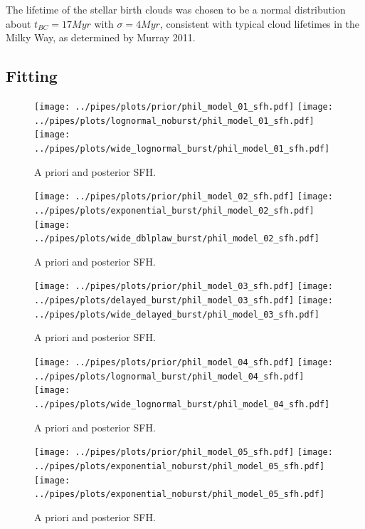 \documentclass[a4paper,11pt]{article}
\begin{document}
The lifetime of the stellar birth clouds was chosen to be a normal distribution about ${t_{BC}=17Myr}$ with ${\sigma=4Myr}$, consistent with typical cloud lifetimes in the Milky Way, as determined by Murray 2011\cite{Murray_2011}.


\subsection{Fitting}\label{sec:fitting}

\begin{figure}[h!]
\centering
  \texttt{[image: ../pipes/plots/prior/phil\_model\_01\_sfh.pdf]}
  \texttt{[image: ../pipes/plots/lognormal\_noburst/phil\_model\_01\_sfh.pdf]}
  \texttt{[image: ../pipes/plots/wide\_lognormal\_burst/phil\_model\_01\_sfh.pdf]}
  \caption{A priori and posterior SFH.}
  \label{}
\end{figure}

\newpage
\begin{figure}[h!]
  \centering
  \texttt{[image: ../pipes/plots/prior/phil\_model\_02\_sfh.pdf]}
  \texttt{[image: ../pipes/plots/exponential\_burst/phil\_model\_02\_sfh.pdf]}
  \texttt{[image: ../pipes/plots/wide\_dblplaw\_burst/phil\_model\_02\_sfh.pdf]}
  \caption{A priori and posterior SFH.}
  \label{}
\end{figure}

\newpage
\begin{figure}[h!]
  \centering
  \texttt{[image: ../pipes/plots/prior/phil\_model\_03\_sfh.pdf]}
  \texttt{[image: ../pipes/plots/delayed\_burst/phil\_model\_03\_sfh.pdf]}
  \texttt{[image: ../pipes/plots/wide\_delayed\_burst/phil\_model\_03\_sfh.pdf]}
  \caption{A priori and posterior SFH.}
  \label{}
\end{figure}

\newpage
\begin{figure}[h!]
  \centering
  \texttt{[image: ../pipes/plots/prior/phil\_model\_04\_sfh.pdf]}
  \texttt{[image: ../pipes/plots/lognormal\_burst/phil\_model\_04\_sfh.pdf]}
  \texttt{[image: ../pipes/plots/wide\_lognormal\_burst/phil\_model\_04\_sfh.pdf]}
  \caption{A priori and posterior SFH.}
  \label{}
\end{figure}

\newpage
\begin{figure}[h!]
  \centering
  \texttt{[image: ../pipes/plots/prior/phil\_model\_05\_sfh.pdf]}
  \texttt{[image: ../pipes/plots/exponential\_noburst/phil\_model\_05\_sfh.pdf]}
  \texttt{[image: ../pipes/plots/exponential\_noburst/phil\_model\_05\_sfh.pdf]}
  \caption{A priori and posterior SFH.}
  \label{}
\end{figure}
\end{document}
